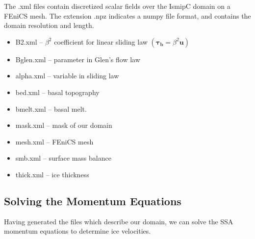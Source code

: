 \documentclass[11pt, reqno, nocenter]{article}
\begin{document}
The .xml files contain discretized scalar fields over the IsmipC domain on a FEniCS mesh. The extension .npz indicates a numpy file format, and contains the domain resolution and length.

\begin{itemize}
\item B2.xml -- $\beta^2$ coefficient for linear sliding law $(\bm{\tau_b} = \beta^2 \bm{u})$
\item  Bglen.xml -- parameter in Glen's flow law
\item alpha.xml -- variable in sliding law 
\item bed.xml -- basal topography
\item bmelt.xml -- basal melt. 
\item mask.xml -- mask of our domain
\item mesh.xml -- FEniCS mesh
\item smb.xml -- surface mass balance
\item thick.xml -- ice thickness

\end{itemize}

\subsection{Solving the Momentum Equations}

Having generated the files which describe our domain, we can solve the SSA momentum equations to determine ice velocities. 
\end{document}
